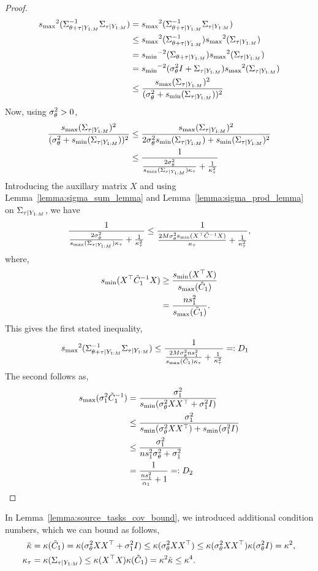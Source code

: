 \begin{proof}
\begin{align}
{s_{\max}}^2(\Sigma_{\theta + \tau \vert Y_{1:M}}^{-1} \Sigma_{\tau \vert Y_{1:M}})
&= {s_{\max}}^2(\Sigma_{\theta + \tau \vert Y_{1:M}}^{-1}\Sigma_{\tau \vert Y_{1:M}}) \\
&\le {s_{\max}}^2(\Sigma_{\theta + \tau \vert Y_{1:M}}^{-1}) {s_{\max}}^2(\Sigma_{\tau \vert Y_{1:M}}) \\
&= {s_{\min}}^{-2}(\Sigma_{\theta + \tau \vert Y_{1:M}}) {s_{\max}}^2(\Sigma_{\tau \vert Y_{1:M}}) \\
&= {s_{\min}}^{-2}({\sigma_\theta^2 I} + \Sigma_{\tau \vert Y_{1:M}}) {s_{\max}}^2(\Sigma_{\tau \vert Y_{1:M}}) \\
&\le \frac{{s_{\max}}(\Sigma_{\tau \vert Y_{1:M}})^2}{({\sigma_\theta^2} + {s_{\min}}(\Sigma_{\tau \vert Y_{1:M}}))^2}
\end{align}
Now, using ${\sigma_\theta^2} > 0$,
\begin{align}
\frac{{s_{\max}}(\Sigma_{\tau \vert Y_{1:M}})^2}{({\sigma_\theta^2} + {s_{\min}}(\Sigma_{\tau \vert Y_{1:M}}))^2} &\le \frac{{s_{\max}}(\Sigma_{\tau \vert Y_{1:M}})^2}{2{\sigma_\theta^2}{s_{\min}}(\Sigma_{\tau \vert Y_{1:M}}) + {s_{\min}}(\Sigma_{\tau \vert Y_{1:M}})^2} \\
&\le \frac{1}{\frac{2{\sigma_\theta^2}}{{s_{\max}}(\Sigma_{\tau \vert Y_{1:M}}) \kappa_\tau} + \frac{1}{\kappa_\tau^2}}
\end{align}
Introducing the auxillary matrix $X$ and using Lemma~\ref{lemma:sigma_sum_lemma} and Lemma~\ref{lemma:sigma_prod_lemma} on $\Sigma_{\tau \vert Y_{1:M}}$, we have
\begin{align}
\frac{1}{\frac{2{\sigma_\theta^2}}{{s_{\max}}(\Sigma_{\tau \vert Y_{1:M}}) \kappa_\tau} + \frac{1}{\kappa_\tau^2}} \le \frac{1}{\frac{2M{\sigma_\theta^2}{s_{\min}}(X_{}^\top \tilde{C}_{}^{-1} X_{})}{\kappa_\tau} + \frac{1}{\kappa_\tau^2}},
\end{align}
where,
\begin{align}
{s_{\min}}(X_{}^\top \tilde{C}_{1}^{-1} X_{}) &\geq \frac{{s_{\min}}(X_{}^\top X_{})}{{s_{\max}}(\tilde{C}_{1})}\\
&= \frac{{n} s_1^2}{{s_{\max}}(\tilde{C}_{1})}.
\end{align}
This gives the first stated inequality,
\begin{align}
{s_{\max}}^2(\Sigma_{\theta + \tau \vert Y_{1:M}}^{-1} \Sigma_{\tau \vert Y_{1:M}})
&\le \frac{1}{\frac{2M{\sigma_\theta^2}{n} s_1^2}{{s_{\max}}(\tilde{C}_{1}) \kappa_\tau} + \frac{1}{\kappa_\tau^2}} =: D_1
\end{align}
The second follows as,
\begin{align}
{s_{\max}}(\sigma_1^2 \tilde{C}_{1}^{-1}) &= \frac{{\sigma_1^2}}{{s_{\min}}(\sigma_\theta^2 X_{} X_{}^\top + \sigma_1^2 I)} \\
&\le\frac{{\sigma_1^2}}{{s_{\min}}(\sigma_\theta^2 X_{} X_{}^\top) + {s_{\min}}(\sigma_1^2 I)}\\
&\le\frac{{\sigma_1^2}}{{n}s_1^2 {\sigma_\theta^2} + {\sigma_1^2}}\\
&=\frac{1}{ \frac{{n}s_1^2}{\alpha_1} + 1} =: D_2
\end{align}
\end{proof}


\noindent In Lemma~\ref{lemma:source_tasks_cov_bound}, we introduced additional condition numbers, which we can bound as follows,
\begin{align}
\tilde{\kappa} &= \kappa(\tilde{C}_{1}) = \kappa(\sigma_\theta^2 X_{} X_{}^\top + \sigma_1^2 I) 
\le \kappa(\sigma_\theta^2 X_{} X_{}^\top) \le \kappa(\sigma_\theta^2 X_{} X_{}^\top) \kappa({\sigma_\theta^2 I}) = \kappa^2,\\
\kappa_\tau &= \kappa(\Sigma_{\tau \vert Y_{1:M}}) \le \kappa(X_{}^\top X_{}) \kappa(\tilde{C}_{1}) = \kappa^2 \tilde{\kappa} \le \kappa^4.
\end{align}


